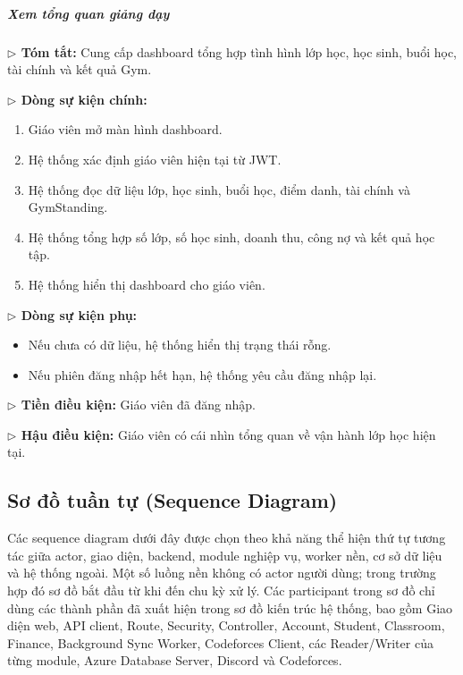 \documentclass[12pt,a4paper]{article}
\newcommand{\code}[1]{{\ttfamily\seqsplit{#1}}}
\begin{document}
\subparagraph{Xem tổng quan giảng dạy}
\textbf{$\triangleright$ Tóm tắt:} Cung cấp dashboard tổng hợp tình hình lớp học, học sinh, buổi học, tài chính và kết quả Gym.

\textbf{$\triangleright$ Dòng sự kiện chính:}
\begin{enumerate}[leftmargin=*]
\item Giáo viên mở màn hình dashboard.
\item Hệ thống xác định giáo viên hiện tại từ JWT.
\item Hệ thống đọc dữ liệu lớp, học sinh, buổi học, điểm danh, tài chính và GymStanding.
\item Hệ thống tổng hợp số lớp, số học sinh, doanh thu, công nợ và kết quả học tập.
\item Hệ thống hiển thị dashboard cho giáo viên.
\end{enumerate}

\textbf{$\triangleright$ Dòng sự kiện phụ:}
\begin{itemize}[leftmargin=*]
\item Nếu chưa có dữ liệu, hệ thống hiển thị trạng thái rỗng.
\item Nếu phiên đăng nhập hết hạn, hệ thống yêu cầu đăng nhập lại.
\end{itemize}

\textbf{$\triangleright$ Tiền điều kiện:} Giáo viên đã đăng nhập.

\textbf{$\triangleright$ Hậu điều kiện:} Giáo viên có cái nhìn tổng quan về vận hành lớp học hiện tại.

\subsection{Sơ đồ tuần tự (Sequence Diagram)}

Các sequence diagram dưới đây được chọn theo khả năng thể hiện thứ tự tương tác
giữa actor, giao diện, backend, module nghiệp vụ, worker nền, cơ sở dữ liệu và
hệ thống ngoài. Một số luồng nền không có actor người dùng; trong trường hợp đó
sơ đồ bắt đầu từ \code{Background Sync Worker} khi đến chu kỳ xử lý. Các participant
trong sơ đồ chỉ dùng các thành phần đã xuất hiện trong
sơ đồ kiến trúc hệ thống, bao gồm Giao diện web, API client, Route, Security,
Controller, Account, Student, Classroom, Finance, Background Sync Worker,
Codeforces Client, các Reader/Writer của từng module, Azure Database Server,
Discord và Codeforces.
\end{document}

